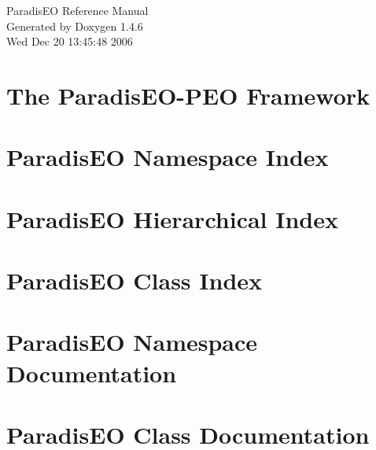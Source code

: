 \documentclass[a4paper]{book}
\begin{document}
\begin{titlepage}
\vspace*{7cm}
\begin{center}
{\Large Paradis\-EO Reference Manual}\\
\vspace*{1cm}
{\large Generated by Doxygen 1.4.6}\\
\vspace*{0.5cm}
{\small Wed Dec 20 13:45:48 2006}\\
\end{center}
\end{titlepage}
\clearemptydoublepage
{}
\tableofcontents
\clearemptydoublepage
{}
\chapter{The Paradis\-EO-PEO Framework }
\label{index}
\chapter{Paradis\-EO Namespace Index}

\chapter{Paradis\-EO Hierarchical Index}

\chapter{Paradis\-EO Class Index}

\chapter{Paradis\-EO Namespace Documentation}

\chapter{Paradis\-EO Class Documentation}
























\printindex
\end{document}
